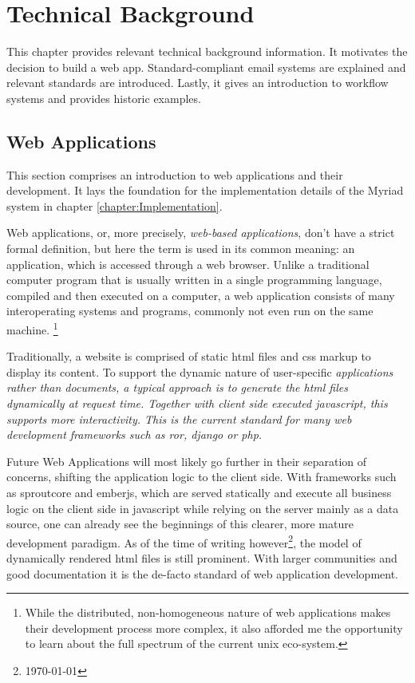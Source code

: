 \chapter{Technical Background}
\label{chapter:Technical}

This chapter provides relevant technical background information. It motivates the decision to build a web app. Standard-compliant email systems are explained and relevant standards are introduced. Lastly, it gives an introduction to workflow systems and provides historic examples.

\section{Web Applications}

This section comprises an introduction to web applications and their development. It lays the foundation for the implementation details of the Myriad system in chapter \autoref{chapter:Implementation}.

Web applications, or, more precisely, \emph{web-based applications}, don't have a strict formal definition, but here the term is used in its common meaning\citep{webapptrends}: an application, which is accessed through a web browser. Unlike a traditional computer program that is usually written in a single programming language, compiled and then executed on a computer, a web application consists of many interoperating systems and programs, commonly not even run on the same machine. \footnote{While the distributed, non-homogeneous nature of web applications makes their development process more complex, it also afforded me the opportunity to learn about the full spectrum of the current unix eco-system.}

Traditionally, a website is comprised of static \gls{html} files and \gls{css} markup to display its content. To support the dynamic nature of user-specific \em{applications} rather than \em{documents}, a typical approach is to generate the \gls{html} files dynamically at request time. Together with client side executed \gls{javascript}, this supports more interactivity. This is the current standard for many web development frameworks such as \gls{ror}, \gls{django} or \gls{php}.

Future Web Applications will most likely go further in their separation of concerns, shifting the application logic to the client side. With frameworks such as \gls{sproutcore} and \gls{emberjs}, which are served statically and execute all business logic on the client side in \gls{javascript} while relying on the server mainly as a data source, one can already see the beginnings of this clearer, more mature development paradigm. As of the time of writing however\footnote{ \today }, the model of dynamically rendered \gls{html} files is still prominent. With larger communities and good documentation it is the de-facto standard of web application development.

